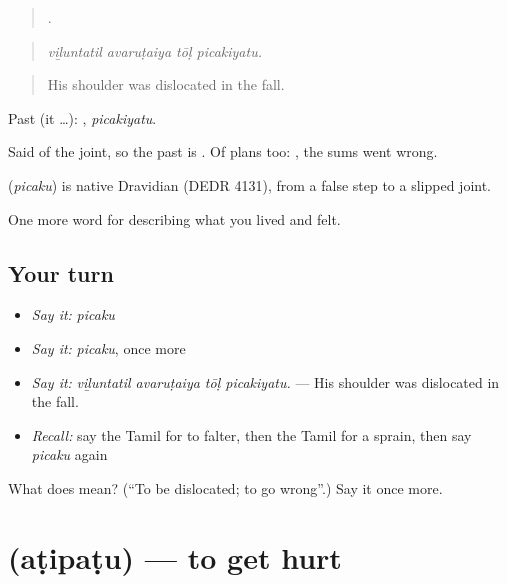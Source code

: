 \begin{quote}
   .
\end{quote}

\begin{quote}
\emph{viḻuntatil avaruṭaiya tōḷ picakiyatu.}
\end{quote}

\begin{quote}
His shoulder was dislocated in the fall.
\end{quote}

Past (it …): , \emph{picakiyatu}.

Said of the joint, so the past is . Of plans too:  , the sums went wrong.

\begin{cousinweb}
\textbf{} (\emph{picaku}) is native Dravidian (DEDR 4131), from a false step to a slipped joint.
\end{cousinweb}

\begin{grammarlens}[title={What you've built}]
One more word for describing what you lived and felt.
\end{grammarlens}

\subsection*{Your turn}
\begin{itemize}
\raggedright
  \item \emph{Say it:} \emph{picaku}
  \item \emph{Say it:} \emph{picaku}, once more
  \item \emph{Say it:} \emph{viḻuntatil avaruṭaiya tōḷ picakiyatu.} — His shoulder was dislocated in the fall.
  \item \emph{Recall:} say the Tamil for to falter, then the Tamil for a sprain, then say \emph{picaku} again
\end{itemize}

\begin{tcolorbox}[breakable,colback=teal!4,colframe=teal!35!black,title={Before you move on}]
What does  mean? (\textquotedblleft{}To be dislocated; to go wrong\textquotedblright{}.) Say it once more.
\end{tcolorbox}
\section[\texorpdfstring{\ta{அடிபடு} (aṭipaṭu)}{அடிபடு (aṭipaṭu)}]{ (aṭipaṭu) — to get hurt}

